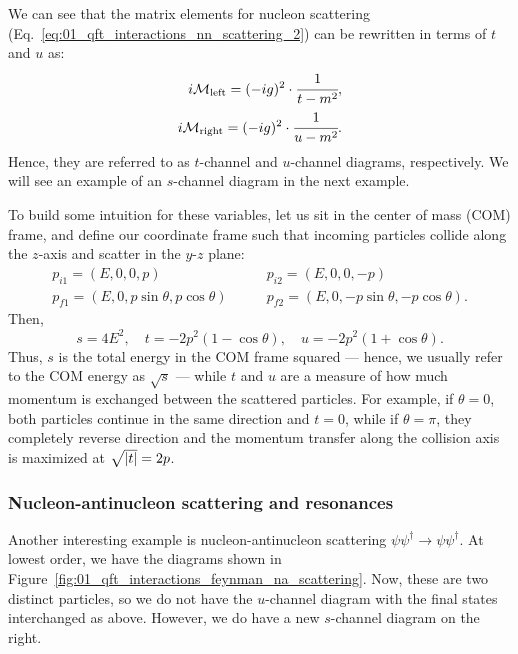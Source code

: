 We can see that the matrix elements for nucleon scattering (Eq.~\ref{eq:01_qft_interactions_nn_scattering_2}) can be rewritten in terms of $t$ and $u$ as:
\begin{equation}
	\label{eq:01_qft_interactions_nn_tchannel_uchannel}
	\begin{split}
		i \mathcal M_{\mathrm{left}} = (-ig)^2 \cdot \cfrac{1}{t - m^2}, \\
		i \mathcal M_{\mathrm{right}} = (-ig)^2 \cdot \cfrac{1}{u - m^2}.
	\end{split}
\end{equation}
Hence, they are referred to as $t$-channel and $u$-channel diagrams, respectively.
We will see an example of an $s$-channel diagram in the next example.

To build some intuition for these variables, let us sit in the center of mass (COM) frame, and define our coordinate frame such that incoming particles collide along the $z$-axis and scatter in the $y$-$z$ plane:
\begin{equation}
	\label{eq:01_qft_interactions_mandelstam_pcom}
	\begin{split}
		p_{i1} = (E, 0, 0, p) &\qquad p_{i2} = (E, 0, 0, -p) \\
		p_{f1} = (E, 0, p\sin\theta, p\cos\theta) &\qquad p_{f2} = (E, 0, -p\sin\theta, -p\cos\theta).
	\end{split}
\end{equation}
Then,
\begin{equation}
	\label{eq:01_qft_interactions_mandelstam_com}
	s = 4E^2, \quad t = -2p^2(1-\cos\theta), \quad u = -2p^2(1+\cos\theta).
\end{equation}
Thus, $s$ is the total energy in the COM frame squared --- hence, we usually refer to the COM energy as $\sqrt{s}$ --- while $t$ and $u$ are a measure of how much momentum is exchanged between the scattered particles.
For example, if $\theta = 0$, both particles continue in the same direction and $t = 0$, while if $\theta = \pi$, they completely
reverse direction and the momentum transfer along the collision axis is maximized at $\sqrt{\left\lvert t \right\rvert} = 2p$.

\subsubsection{Nucleon-antinucleon scattering and resonances}

Another interesting example is nucleon-antinucleon scattering $\psi\psi^\dagger \rightarrow \psi\psi^\dagger$.
At lowest order, we have the diagrams shown in Figure~\ref{fig:01_qft_interactions_feynman_na_scattering}.
Now, these are two distinct particles, so we do not have the $u$-channel diagram with the final states interchanged as above.
However, we do have a new $s$-channel diagram on the right.

